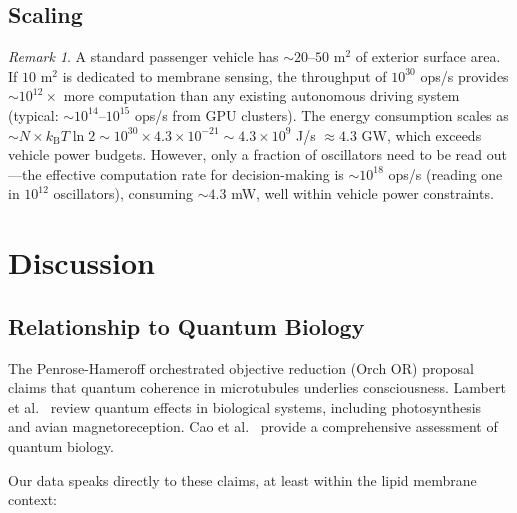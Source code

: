 \documentclass[12pt]{article}
\theoremstyle{definition}
\theoremstyle{remark}
\newtheorem{remark}[theorem]{Remark}
\newcommand{\kB}{k_{\mathrm{B}}}
\begin{document}
\subsection{Scaling}

\begin{remark}
A standard passenger vehicle has $\sim 20$--$50$ m$^2$ of exterior surface area. If $10$ m$^2$ is dedicated to membrane sensing, the throughput of $10^{30}$ ops/s provides $\sim 10^{12}\times$ more computation than any existing autonomous driving system (typical: $\sim 10^{14}$--$10^{15}$ ops/s from GPU clusters). The energy consumption scales as $\sim N \times \kB T \ln 2 \sim 10^{30} \times 4.3 \times 10^{-21} \sim 4.3 \times 10^{9}$ J/s $\approx 4.3$ GW, which exceeds vehicle power budgets. However, only a fraction of oscillators need to be read out---the effective computation rate for decision-making is $\sim 10^{18}$ ops/s (reading one in $10^{12}$ oscillators), consuming $\sim 4.3$ mW, well within vehicle power constraints.
\end{remark}


\section{Discussion}
\label{sec:discussion}

\subsection{Relationship to Quantum Biology}

The Penrose-Hameroff orchestrated objective reduction (Orch OR) proposal~\citep{penrose1989emperor, hameroff1996orchestrated} claims that quantum coherence in microtubules underlies consciousness. Lambert et al.~\citep{lambert2013quantum} review quantum effects in biological systems, including photosynthesis~\citep{engel2007evidence} and avian magnetoreception. Cao et al.~\citep{cao2020quantum} provide a comprehensive assessment of quantum biology.

Our data speaks directly to these claims, at least within the lipid membrane context:
\end{document}
